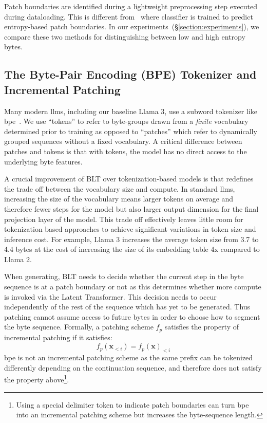 Patch boundaries are identified during a lightweight preprocessing step executed during dataloading. This is different from~\citet{nawrot-etal-2023-efficient} where classifier is trained to predict entropy-based patch boundaries. In our experiments~(\S\ref{section:experiments}), we compare these two methods for distinguishing between low and high entropy bytes. 

\subsection{The Byte-Pair Encoding (BPE) Tokenizer and Incremental Patching}
\label{section:incremental-patching}
\label{section:bpe-patch}

Many modern llms, including our baseline Llama 3, use a subword tokenizer like bpe~\citep{gage1994new, sennrich-etal-2016-neural}. We use ``tokens'' to refer to byte-groups drawn from a \textit{finite} vocabulary determined prior to training as opposed to ``patches'' which refer to dynamically grouped sequences without a fixed vocabulary. A critical difference between patches and tokens is that with tokens, the model has no direct access to the underlying byte features. 

A crucial improvement of {\textsc BLT} over tokenization-based models is that redefines the trade off between the vocabulary size and compute. In standard llms, increasing the size of the vocabulary means larger tokens on average and therefore fewer steps for the model but also larger output dimension for the final projection layer of the model. This trade off effectively leaves little room for tokenization based approaches to achieve significant variations in token size and inference cost. For example, Llama 3 increases the average token size from  3.7 to 4.4 bytes at the cost of increasing the size of its embedding table 4x compared to Llama 2.

When generating, {\textsc BLT} needs to decide whether the current step in the byte sequence is at a patch boundary or not as this determines whether more compute is invoked via the Latent Transformer. This decision needs to occur independently of the rest of the sequence which has yet to be generated. Thus patching cannot assume access to future bytes in order to choose how to segment the byte sequence. Formally, a patching scheme $f_p$ satisfies the property of incremental patching if it satisfies:
$$f_p(\pmb{x}_{<i}) = f_p(\pmb{x})_{<i}$$
bpe is not an incremental patching scheme as the same prefix can be tokenized differently depending on the continuation sequence, and therefore does not satisfy the property above\footnote{Using a special delimiter token to indicate patch boundaries can turn bpe into an incremental patching scheme but increases the byte-sequence length.}. 

